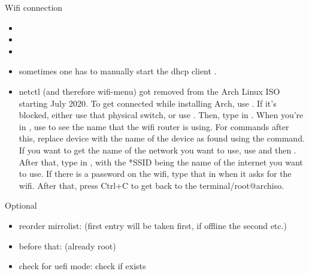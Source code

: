 \begin{frame}{Wifi connection}
  \begin{itemize}
    \item {}
    \item {}
    \item {}
  \end{itemize}
  \begin{Sidenote}
    \begin{itemize}
      \scriptsize
      \item sometimes one has to manually start the dhcp client .
      \item netctl (and therefore wifi-menu) got removed from the Arch Linux ISO starting July 2020. To get connected while installing Arch, use . If it's blocked, either use that physical switch, or use . Then, type in . When you're in , use  to see the name that the wifi router is using. For commands after this, replace device with the name of the device as found using the  command. If you want to get the name of the network you want to use, use  and then . After that, type in , with the *SSID being the name of the internet you want to use. If there is a password on the wifi, type that in when it asks for the wifi. After that, press Ctrl+C to get back to the terminal/root@archiso.
    \end{itemize}
  \end{Sidenote}
\end{frame}

\begin{frame}[fragile]{Optional}
  \begin{itemize}
    \item reorder mirrolist:  (first entry will be taken first, if offline the second etc.)
    \item before that:  (already root)
    \item check for uefi mode:  check if exists
  \end{itemize}
\end{frame}

